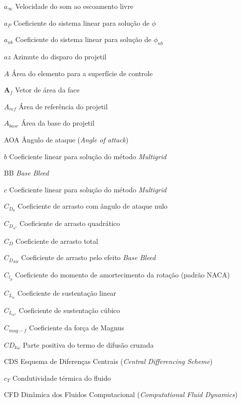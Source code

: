 \begin{siglas}
    \item[\(a_\infty\)] Velocidade do som ao escoamento livre
    \item[\(a_P\)] Coeficiente do sistema linear para solução de $\phi$
    \item[\(a_{nb}\)] Coeficiente do sistema linear para solução de $\phi_{nb}$
    \item[\(az\)] Azimute do disparo do projetil
    \item[\(A\)] Área do elemento para a superfície de controle
    \item[\(\textbf{A}_{f}\)] Vetor de área da face
    \item[\(A_{ref}\)] Área de referência do projetil
    \item[\(A_{base}\)] Área da base do projetil
    \item[AOA] Ângulo de ataque (\textit{Angle of attack})
    \item[\(b\)] Coeficiente linear para solução do método \textit{Multigrid}
    \item[BB] \textit{Base Bleed}
    \item[\(c\)] Coeficiente linear para solução do método \textit{Multigrid}
    \item[\(C_{D_0}\)] Coeficiente de arrasto com ângulo de ataque nulo
    \item[\(C_{D_{\alpha^2}}\)] Coeficiente de arrasto quadrático
    \item[\(C_{D}\)] Coeficiente de arrasto total
    \item[\(C_{D_{BB}}\)] Coeficiente de arrasto pelo efeito \textit{Base Bleed}
    \item[\(C_{l_p}\)] Coeficiente do momento de amortecimento da rotação (padrão NACA)
    \item[\(C_{L_\alpha}\)] Coeficiente de sustentação linear
    \item[\(C_{L_{\alpha^3}}\)] Coeficiente de sustentação cúbico
    \item[\(C_{mag-f}\)] Coeficiente da força de Magnus
    \item[\(CD_{k\omega}\)] Parte positiva do termo de difusão cruzada
    \item[CDS] Esquema de Diferenças Centrais (\textit{Central Differencing Scheme})
    \item[\(c_T\)] Condutividade térmica do fluido
    \item[CFD] Dinâmica dos Fluidos Computacional (\textit{Computational Fluid Dynamics})

\end{siglas}
